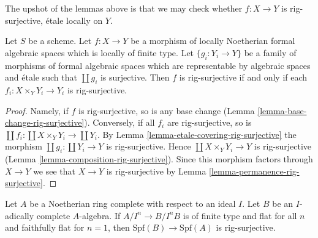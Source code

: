 \noindent
The upshot of the lemmas above is that we may check whether
$f : X \to Y$ is rig-surjective, \'etale locally on $Y$.

\begin{lemma}
\label{lemma-upshot}
Let $S$ be a scheme. Let $f : X \to Y$ be a morphism of locally
Noetherian formal algebraic spaces which is locally of finite type.
Let $\{g_i : Y_i \to Y\}$ be a family of morphisms of formal
algebraic spaces which are representable by algebraic spaces and
\'etale such that $\coprod g_i$ is surjective.
Then $f$ is rig-surjective if and only if each
$f_i : X \times_Y Y_i \to Y_i$ is rig-surjective.
\end{lemma}

\begin{proof}
Namely, if $f$ is rig-surjective, so is any base change
(Lemma \ref{lemma-base-change-rig-surjective}).
Conversely, if all $f_i$ are rig-surjective, so is
$\coprod f_i : \coprod X \times_Y Y_i \to \coprod Y_i$.
By Lemma \ref{lemma-etale-covering-rig-surjective}
the morphism $\coprod g_i : \coprod Y_i \to Y$ is rig-surjective.
Hence $\coprod X \times_Y Y_i \to Y$ is rig-surjective
(Lemma \ref{lemma-composition-rig-surjective}).
Since this morphism factors through $X \to Y$ we see that $X \to Y$
is rig-surjective by Lemma \ref{lemma-permanence-rig-surjective}.
\end{proof}

\begin{lemma}
\label{lemma-faithfully-flat-rig-surjective}
Let $A$ be a Noetherian ring complete with respect to an ideal $I$.
Let $B$ be an $I$-adically complete $A$-algebra.
If $A/I^n \to B/I^nB$ is of finite type and flat for all $n$ and
faithfully flat for $n = 1$, then $\text{Spf}(B) \to \text{Spf}(A)$
is rig-surjective.
\end{lemma}

